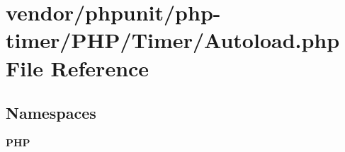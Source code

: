 \section{vendor/phpunit/php-\/timer/\+P\+H\+P/\+Timer/\+Autoload.php File Reference}
\label{vendor_2phpunit_2php-timer_2_p_h_p_2_timer_2autoload_8php}
\subsection*{Namespaces}
\begin{DoxyCompactItemize}
\item 
 {\bf P\+H\+P}
\end{DoxyCompactItemize}
